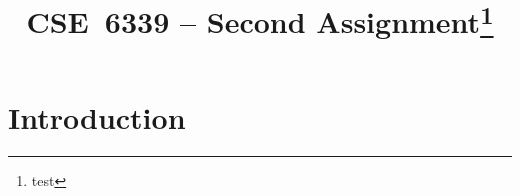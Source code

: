 \documentclass[conference]{IEEEtran}
\begin{document}
\title{
CSE~6339 -- Second Assignment\thanks{test}
}

\author{
}

\maketitle


\begin{abstract}
\end{abstract}

\section{Introduction}

% 
% 

\appendix

\begin{framed}
\fontsize{5.7}{6.84}\selectfont

\end{framed}
\end{document}

